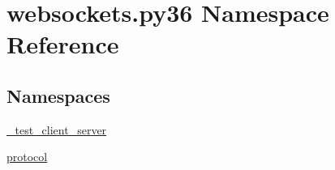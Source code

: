 \hypertarget{namespacewebsockets_1_1py36}{}\section{websockets.\+py36 Namespace Reference}
\label{namespacewebsockets_1_1py36}
\subsection*{Namespaces}
\begin{DoxyCompactItemize}
\item 
 \hyperlink{namespacewebsockets_1_1py36_1_1__test__client__server}{\+\_\+test\+\_\+client\+\_\+server}
\item 
 \hyperlink{namespacewebsockets_1_1py36_1_1protocol}{protocol}
\end{DoxyCompactItemize}
